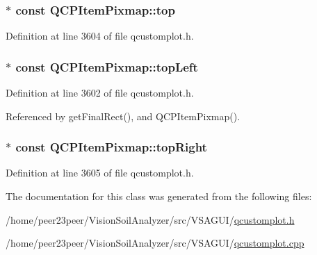 \hypertarget{class_q_c_p_item_pixmap_af7a156590b1d59ab21b453c430c56a7c}{}
\subsubsection[{top}]{$\ast$ const Q\+C\+P\+Item\+Pixmap\+::top}\label{class_q_c_p_item_pixmap_af7a156590b1d59ab21b453c430c56a7c}


Definition at line 3604 of file qcustomplot.\+h.

\hypertarget{class_q_c_p_item_pixmap_a43c281ef6ad46f3cf04f365289abe51a}{}
\subsubsection[{top\+Left}]{$\ast$ const Q\+C\+P\+Item\+Pixmap\+::top\+Left}\label{class_q_c_p_item_pixmap_a43c281ef6ad46f3cf04f365289abe51a}


Definition at line 3602 of file qcustomplot.\+h.



Referenced by get\+Final\+Rect(), and Q\+C\+P\+Item\+Pixmap().

\hypertarget{class_q_c_p_item_pixmap_a72eabd0010be41a4ec1b22aa983d2aa1}{}
\subsubsection[{top\+Right}]{$\ast$ const Q\+C\+P\+Item\+Pixmap\+::top\+Right}\label{class_q_c_p_item_pixmap_a72eabd0010be41a4ec1b22aa983d2aa1}


Definition at line 3605 of file qcustomplot.\+h.



The documentation for this class was generated from the following files\+:\begin{DoxyCompactItemize}
\item 
/home/peer23peer/\+Vision\+Soil\+Analyzer/src/\+V\+S\+A\+G\+U\+I/\hyperlink{qcustomplot_8h}{qcustomplot.\+h}\item 
/home/peer23peer/\+Vision\+Soil\+Analyzer/src/\+V\+S\+A\+G\+U\+I/\hyperlink{qcustomplot_8cpp}{qcustomplot.\+cpp}\end{DoxyCompactItemize}
